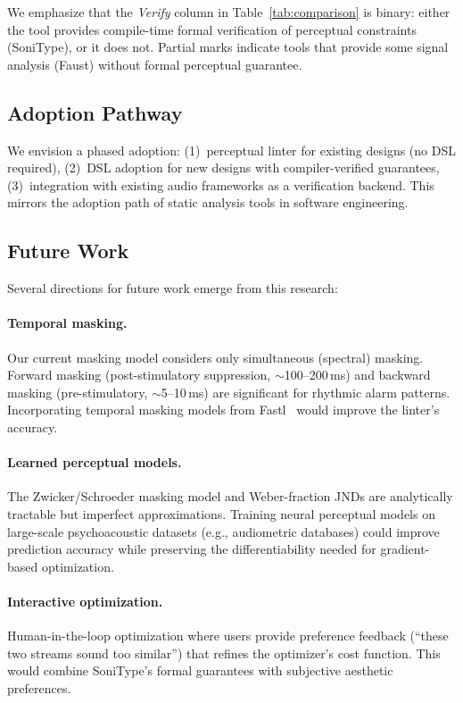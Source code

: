 \documentclass[sigchi, nonacm]{acmart}
\begin{document}
We emphasize that the \emph{Verify} column in Table~\ref{tab:comparison} is binary: either the tool provides compile-time formal verification of perceptual constraints (SoniType), or it does not. Partial marks indicate tools that provide some signal analysis (Faust) without formal perceptual guarantee.

\subsection{Adoption Pathway}

We envision a phased adoption: (1)~perceptual linter for existing designs (no DSL required), (2)~DSL adoption for new designs with compiler-verified guarantees, (3)~integration with existing audio frameworks as a verification backend. This mirrors the adoption path of static analysis tools in software engineering.

\subsection{Future Work}

Several directions for future work emerge from this research:

\paragraph{Temporal masking.} Our current masking model considers only simultaneous (spectral) masking. Forward masking (post-stimulatory suppression, $\sim$100--200\,ms) and backward masking (pre-stimulatory, $\sim$5--10\,ms) are significant for rhythmic alarm patterns. Incorporating temporal masking models from Fastl~\cite{zwicker2013psychoacoustics} would improve the linter's accuracy.

\paragraph{Learned perceptual models.} The Zwicker/Schroeder masking model and Weber-fraction JNDs are analytically tractable but imperfect approximations. Training neural perceptual models on large-scale psychoacoustic datasets (e.g., audiometric databases) could improve prediction accuracy while preserving the differentiability needed for gradient-based optimization.

\paragraph{Interactive optimization.} Human-in-the-loop optimization where users provide preference feedback (``these two streams sound too similar'') that refines the optimizer's cost function. This would combine SoniType's formal guarantees with subjective aesthetic preferences.
\end{document}
